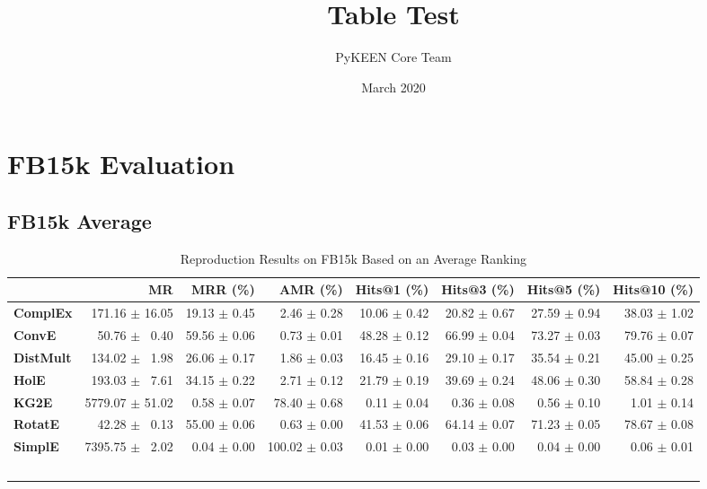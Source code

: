 \documentclass[journal]{IEEEtran}
\title{Table Test}
\author{PyKEEN Core Team}
\date{March 2020}
\begin{document}
\section{FB15k Evaluation}
\subsection{FB15k Average}
\begin{table*}
    \caption{Reproduction Results on FB15k Based on an Average Ranking}
    \label{tab:fb15k_full_results_average_ranking}
    \centering
    \begin{tabular}{lrrrrrrr}
\toprule
{} &               MR &      MRR (\%) &       AMR (\%) &   Hits@1 (\%) &   Hits@3 (\%) &   Hits@5 (\%) &  Hits@10 (\%) \\
\midrule
\textbf{ComplEx } &  $\phantom{5}$171.16 $\pm$ 16.05 &  19.13 $\pm$ 0.45 &  $\phantom{5}$$\phantom{5}$2.46 $\pm$ 0.28 &  10.06 $\pm$ 0.42 &  20.82 $\pm$ 0.67 &  27.59 $\pm$ 0.94 &  38.03 $\pm$ 1.02 \\
\textbf{ConvE   } &  $\phantom{5}$$\phantom{5}$50.76 $\pm$ $\phantom{5}$0.40 &  59.56 $\pm$ 0.06 &  $\phantom{5}$$\phantom{5}$0.73 $\pm$ 0.01 &  48.28 $\pm$ 0.12 &  66.99 $\pm$ 0.04 &  73.27 $\pm$ 0.03 &  79.76 $\pm$ 0.07 \\
\textbf{DistMult} &  $\phantom{5}$134.02 $\pm$ $\phantom{5}$1.98 &  26.06 $\pm$ 0.17 &  $\phantom{5}$$\phantom{5}$1.86 $\pm$ 0.03 &  16.45 $\pm$ 0.16 &  29.10 $\pm$ 0.17 &  35.54 $\pm$ 0.21 &  45.00 $\pm$ 0.25 \\
\textbf{HolE    } &  $\phantom{5}$193.03 $\pm$ $\phantom{5}$7.61 &  34.15 $\pm$ 0.22 &  $\phantom{5}$$\phantom{5}$2.71 $\pm$ 0.12 &  21.79 $\pm$ 0.19 &  39.69 $\pm$ 0.24 &  48.06 $\pm$ 0.30 &  58.84 $\pm$ 0.28 \\
\textbf{KG2E    } &  5779.07 $\pm$ 51.02 &  $\phantom{5}$0.58 $\pm$ 0.07 &  $\phantom{5}$78.40 $\pm$ 0.68 &  $\phantom{5}$0.11 $\pm$ 0.04 &  $\phantom{5}$0.36 $\pm$ 0.08 &  $\phantom{5}$0.56 $\pm$ 0.10 &  $\phantom{5}$1.01 $\pm$ 0.14 \\
\textbf{RotatE  } &  $\phantom{5}$$\phantom{5}$42.28 $\pm$ $\phantom{5}$0.13 &  55.00 $\pm$ 0.06 &  $\phantom{5}$$\phantom{5}$0.63 $\pm$ 0.00 &  41.53 $\pm$ 0.06 &  64.14 $\pm$ 0.07 &  71.23 $\pm$ 0.05 &  78.67 $\pm$ 0.08 \\
\textbf{SimplE  } &  7395.75 $\pm$ $\phantom{5}$2.02 &  $\phantom{5}$0.04 $\pm$ 0.00 &  100.02 $\pm$ 0.03 &  $\phantom{5}$0.01 $\pm$ 0.00 &  $\phantom{5}$0.03 $\pm$ 0.00 &  $\phantom{5}$0.04 $\pm$ 0.00 &  $\phantom{5}$0.06 $\pm$ 0.01 \\
$$
\end{tabular}
\end{table*}
\end{document}
